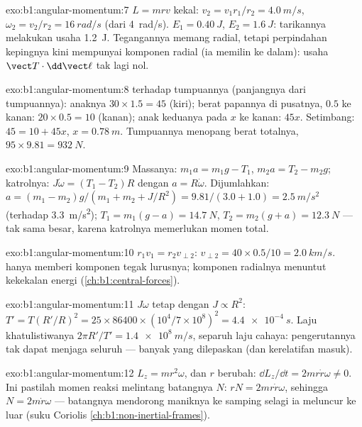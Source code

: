 \begin{solution}{exo:b1:angular-momentum:7}
$L = mrv$ kekal: $v_2 = v_1r_1/r_2 = \qty{4.0}{m/s}$, $\omega_2 = v_2/r_2
= \qty{16}{rad/s}$ (dari \qty{4}{rad/s}). $E_1 = \qty{0.40}{J}$, $E_2 =
\qty{1.6}{J}$: tarikannya melakukan usaha \qty{1.2}{J}. Tegangannya
memang radial, tetapi perpindahan kepingnya kini mempunyai komponen
radial (ia memilin ke dalam): usaha $\vect T\cdot\dd\vect\ell$ tak lagi nol.
\end{solution}

\begin{solution}{exo:b1:angular-momentum:8}
 terhadap tumpuannya (panjangnya dari tumpuannya): anaknya $30 \times 1.5 =
45$ (kiri); berat papannya di pusatnya, $0.5$ ke kanan: $20 \times
0.5 = 10$ (kanan); anak keduanya pada $x$ ke kanan: $45x$. Setimbang:
$45 = 10 + 45x$, $x = \qty{0.78}{m}$. Tumpuannya menopang berat totalnya,
$95 \times 9.81 = \qty{932}{N}$.
\end{solution}

\begin{solution}{exo:b1:angular-momentum:9}
Massanya: $m_1a = m_1g - T_1$, $m_2a = T_2 - m_2g$; katrolnya: $J\dot\omega =
(T_1 - T_2)R$ dengan $a = R\dot\omega$. Dijumlahkan: $a = (m_1 - m_2)g/(m_1 + m_2 +
J/R^2) = 9.81/(3.0 + 1.0) = \qty{2.5}{m/s^2}$ (terhadap \qty{3.3}{m/s^2});
$T_1 = m_1(g - a) = \qty{14.7}{N}$, $T_2 = m_2(g + a) = \qty{12.3}{N}$ ---
tak sama besar, karena katrolnya memerlukan momen total.
\end{solution}

\begin{solution}{exo:b1:angular-momentum:10}
$r_1v_1 = r_2v_{\perp 2}$: $v_{\perp 2} = 40 \times 0.5/10 = \qty{2.0}{km/s}$.
 hanya memberi komponen tegak lurusnya; komponen
radialnya menuntut kekekalan energi (\cref{ch:b1:central-forces}).
\end{solution}

\begin{solution}{exo:b1:angular-momentum:11}
$J\omega$ tetap dengan $J \propto R^2$: $T' = T(R'/R)^2 = 25 \times 86400
\times (10^4/7\times10^8)^2 = \qty{4.4e-4}{s}$. Laju khatulistiwanya $2\pi R'/T'
= \qty{1.4e8}{m/s}$, separuh laju cahaya: pengerutannya tak dapat menjaga
seluruh  --- banyak yang dilepaskan (dan kerelatifan masuk).
\end{solution}

\begin{solution}{exo:b1:angular-momentum:12}
$L_z = mr^2\omega$, dan $r$ berubah: $\dd L_z/\dd t = 2mr\dot r\omega \neq 0$.
Ini pastilah momen reaksi melintang batangnya $N$: $rN =
2mr\dot r\omega$, sehingga $N = 2m\dot r\omega$ --- batangnya mendorong
maniknya ke samping selagi ia meluncur ke luar (suku Coriolis
\cref{ch:b1:non-inertial-frames}).
\end{solution}

